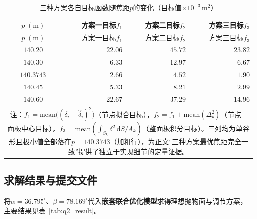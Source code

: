 \documentclass[withoutpreface]{cumcmthesis}
\begin{document}
\begin{longtable}{c r r r}
\caption{三种方案各自目标函数随焦距$p$的变化（目标值$\times10^{-3}\,\mathrm{m}^{2}$）} \label{tab:p_obj_compare} \\
\toprule
$p\;(\mathrm{m})$ & 方案一目标$f_1$ & 方案二目标$f_2$ & 方案三目标$f_3$ \\
\midrule
\endfirsthead
\toprule
$p\;(\mathrm{m})$ & 方案一目标$f_1$ & 方案二目标$f_2$ & 方案三目标$f_3$ \\
\midrule
\endhead
\bottomrule
\endfoot
\bottomrule
\endlastfoot
$140.20$ & $22.06$ & $45.72$ & $23.82$ \\
$140.30$ & $6.33$ & $12.97$ & $6.67$ \\
$\mathbf{140.3743}$ & $\mathbf{2.66}$ & $\mathbf{4.52}$ & $\mathbf{1.90}$ \\
$140.45$ & $5.33$ & $8.21$ & $2.99$ \\
$140.60$ & $22.67$ & $37.29$ & $14.96$ \\
\midrule
\multicolumn{4}{p{13.0cm}}{\small 注：$f_1=\mathrm{mean}\bigl((\delta_i-\hat{\delta}_i)^{2}\bigr)$（节点拟合目标），$f_2=f_1+\mathrm{mean}(\Delta_k^{2})$（节点$+$面板中心目标），$f_3=\mathrm{mean}(\int_{S_k}\delta^{2}\,\mathrm{d}S/A_k)$（整面板积分目标）。三列均为单谷形且极小值全部落在$p=140.3743$（加粗行），为正文``三种方案最优焦距完全一致''提供了独立于实现细节的定量证据。}\\
\bottomrule
\end{longtable}

\subsection{求解结果与提交文件}

将$\alpha=36.795^{\circ}$、$\beta=78.169^{\circ}$代入\textbf{嵌套联合优化模型}求得理想抛物面与调节方案，主要结果见表~\ref{tab:q2_result}。
\end{document}
